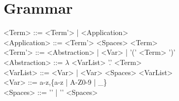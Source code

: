 \documentclass{article}
\author{Иван Похабов}
\date{April 2025}
\begin{document}
\section*{Grammar}

\noindent<Term> ::= <Term'> | <Application> \\
<Application> ::= <Term'> <Spaces> <Term> \\
<Term'> ::= <Abstraction> | <Var> | '(' <Term> ')' \\
<Abstraction> ::= $\lambda$ <VarList> '.' <Term> \\
<VarList> ::= <Var> | <Var> <Spaces> <VarList> \\
<Var> ::= a-z,\{a-z | A-Z0-9 | \_\} \\
<Spaces> ::= '\space' | '\space' <Spaces>
\end{document}
